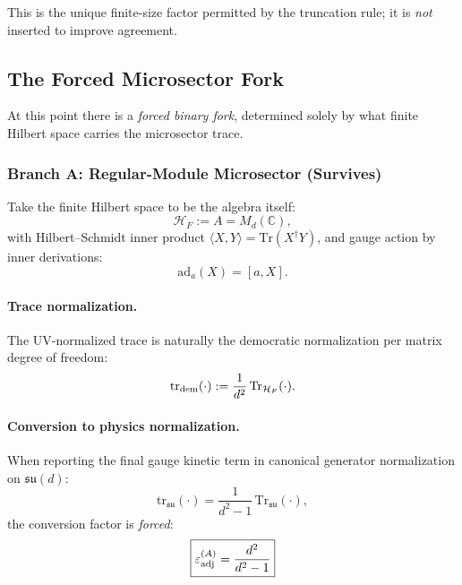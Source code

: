 This is the unique finite-size factor permitted by the truncation rule; it is \emph{not} inserted to improve agreement.

\subsection{The Forced Microsector Fork}\label{sec:alpha-forced-fork}

At this point there is a \emph{forced binary fork}, determined solely by what finite Hilbert space carries the microsector trace.

\subsubsection{Branch A: Regular-Module Microsector (Survives)}

Take the finite Hilbert space to be the algebra itself:
\begin{equation}\label{eq:HF-regular}
\mathcal{H}_F := A = M_d(\mathbb{C}),
\end{equation}
with Hilbert--Schmidt inner product $\langle X, Y \rangle = \mathrm{Tr}(X^\dagger Y)$, and gauge action by inner derivations:
\begin{equation}
\mathrm{ad}_a(X) = [a, X].
\end{equation}

\paragraph{Trace normalization.}
The UV-normalized trace is naturally the democratic normalization per matrix degree of freedom:
\begin{equation}\label{eq:tr-dem}
\mathrm{tr}_{\rm dem}(\cdot) := \frac{1}{d^2}\,\mathrm{Tr}_{\mathcal{H}_F}(\cdot).
\end{equation}

\paragraph{Conversion to physics normalization.}
When reporting the final gauge kinetic term in canonical generator normalization on $\mathfrak{su}(d)$:
\begin{equation}
\mathrm{tr}_{\mathfrak{su}}(\cdot) = \frac{1}{d^2 - 1}\,\mathrm{Tr}_{\mathfrak{su}}(\cdot),
\end{equation}
the conversion factor is \emph{forced}:
\begin{equation}\label{eq:boost-factor}
\boxed{\varepsilon_{\rm adj}^{(A)} = \frac{d^2}{d^2 - 1}}
\end{equation}

